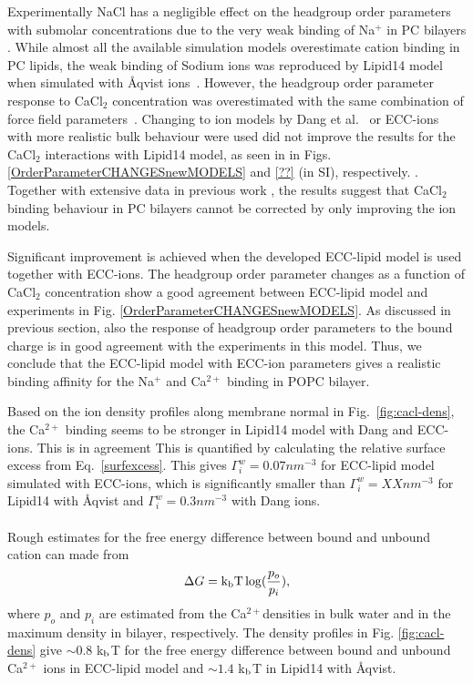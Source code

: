 \documentclass[aip,jcp,twocolumn]{revtex4}
\begin{document}
Experimentally NaCl has a negligible effect on the headgroup order parameters
with submolar concentrations due to the very weak binding of Na$^+$
in PC bilayers \cite{akutsu81,catte16}. 
While almost all the available simulation models overestimate cation
binding in PC lipids, the weak binding of Sodium ions was reproduced by
Lipid14 model when simulated with \AA{}qvist ions~\cite{catte16}.
However, the headgroup order parameter response to CaCl$_2$ concentration was
overestimated with the same combination of force field parameters~\cite{catte16}.
Changing to ion models by Dang et al.~\cite{smith94,chang1999,dang2006} or
ECC-ions~\cite{jungwirth17-new-paper-to-be-published, kohagen16, Pluharova2014}
with more realistic bulk behaviour were used did not improve the results
for the CaCl$_2$ interactions with Lipid14 model, as seen in 
in Figs. \ref{OrderParameterCHANGESnewMODELS} and \ref{??} (in SI), respectively.
.
Together with extensive data in previous work \cite{catte16}, 
the results suggest that CaCl$_2$ binding behaviour in PC bilayers
cannot be corrected by only improving the ion models. 

Significant improvement is achieved when the developed ECC-lipid model 
is used together with ECC-ions. The headgroup order parameter changes
as a function of CaCl$_2$ concentration show a good agreement between
ECC-lipid model and experiments in Fig. \ref{OrderParameterCHANGESnewMODELS}.
As discussed in previous section, also the response of headgroup order
parameters to the bound charge is in good agreement with the experiments in this
model. Thus, we conclude that the ECC-lipid model with ECC-ion parameters
gives a realistic binding affinity for the Na$^+$ and Ca$^{2+}$ binding
in POPC bilayer.

Based on the ion density profiles along membrane normal
in Fig.~\ref{fig:cacl-dens}, the Ca$^{2+}$ binding seems to
be stronger in Lipid14 model with Dang and ECC-ions.
This is in agreement 
This is quantified by calculating the relative surface
excess from Eq.~\ref{surfexcess}. This gives 
$\Gamma_i^w = 0.07 nm^{-3}$ for ECC-lipid model simulated with ECC-ions,
which is significantly smaller than $\Gamma_i^w = XX nm^{-3}$ for
Lipid14 with \AA{}qvist and $\Gamma_i^w = 0.3 nm^{-3}$ with Dang ions.
 \\
 \\
Rough estimates for the free energy difference between bound and unbound cation
can made from
\begin{equation}
  \Delta G={\rm k_b T}\log(\frac{p_o}{p_i}),
\end{equation}
where $p_o$ and $p_i$ are estimated from the Ca$^{2+}$densities in bulk water and
in the maximum density in bilayer, respectively. The density profiles in
Fig. \ref{fig:cacl-dens} give $\sim 0.8$ k$_{\rm b}$T for the free energy difference
between bound and unbound Ca$^{2+}$ ions in ECC-lipid model and $\sim 1.4$ k$_{\rm b}$T
in Lipid14 with \AA{}qvist.
\end{document}
